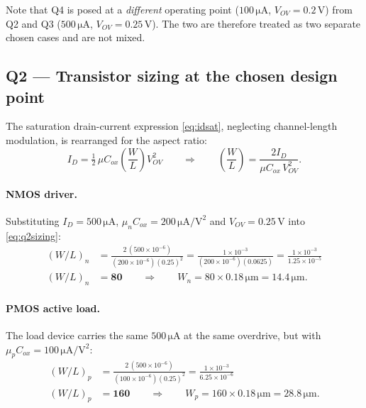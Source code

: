 \documentclass[12pt,a4paper]{article}
\newcommand{\U}[1]{\,\mathrm{#1}}
\newcommand{\WL}{\left(\dfrac{W}{L}\right)}
\newcommand{\WLi}[1]{\left(W/L\right)_{#1}}
\begin{document}
Note that Q4 is posed at a \emph{different} operating point ($100\U{\mu A}$,
$V_{OV}=0.2\U{V}$) from Q2 and Q3 ($500\U{\mu A}$, $V_{OV}=0.25\U{V}$). The two
are therefore treated as two separate chosen cases and are not mixed.

\subsection{Q2 --- Transistor sizing at the chosen design point}
\label{sec:q2}
The saturation drain-current expression \eqref{eq:idsat}, neglecting
channel-length modulation, is rearranged for the aspect ratio:
\begin{equation}
I_D = \tfrac{1}{2}\,\mu C_{ox}\WL V_{OV}^{2}
\qquad\Longrightarrow\qquad
\WL = \frac{2 I_D}{\mu C_{ox}\,V_{OV}^{2}} .
\label{eq:q2sizing}
\end{equation}

\paragraph{NMOS driver.}
Substituting $I_D = 500\U{\mu A}$, $\mu_n C_{ox} = 200\U{\mu A/V^2}$ and
$V_{OV} = 0.25\U{V}$ into \eqref{eq:q2sizing}:
\begin{align*}
\WLi{n} &= \frac{2\,(500\times10^{-6})}
                {(200\times10^{-6})(0.25)^{2}}
         = \frac{1\times10^{-3}}{(200\times10^{-6})(0.0625)}
         = \frac{1\times10^{-3}}{1.25\times10^{-5}}\\[2pt]
\WLi{n} &= \mathbf{80}
\qquad\Longrightarrow\qquad
W_n = 80 \times 0.18\U{\mu m} = 14.4\U{\mu m}.
\end{align*}

\paragraph{PMOS active load.}
The load device carries the same $500\U{\mu A}$ at the same overdrive, but with
$\mu_p C_{ox} = 100\U{\mu A/V^2}$:
\begin{align*}
\WLi{p} &= \frac{2\,(500\times10^{-6})}
                {(100\times10^{-6})(0.25)^{2}}
         = \frac{1\times10^{-3}}{6.25\times10^{-6}}\\[2pt]
\WLi{p} &= \mathbf{160}
\qquad\Longrightarrow\qquad
W_p = 160 \times 0.18\U{\mu m} = 28.8\U{\mu m}.
\end{align*}
\end{document}

